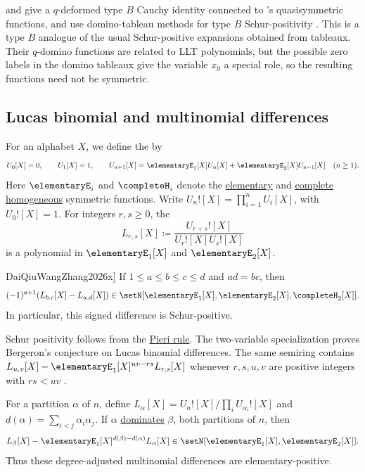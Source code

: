  and  give a
$q$-deformed type $B$ Cauchy identity connected to 's
quasisymmetric functions, and use domino-tableau methods for type $B$
Schur-positivity \cite{MayorovaVassilieva2022}.  This is a type $B$ analogue
of the usual Schur-positive expansions obtained from tableaux.
Their $q$-domino functions are related to LLT polynomials, but the possible
zero labels in the domino tableaux give the variable $x_0$ a special role, so
the resulting functions need not be symmetric.


\subsection[lucasSymmetricPositivity]{Lucas binomial and multinomial differences}

For an alphabet $X$, we define the  by
\[
 U_0[X]=0,\qquad U_1[X]=1,\qquad
 U_{n+1}[X]=\elementaryE_1[X]U_n[X]+\elementaryE_2[X]U_{n-1}[X]
 \quad(n\geq1).
\]
Here $\elementaryE_i$ and $\completeH_i$ denote the
\hyperref[elementaryE]{elementary} and
\hyperref[completeH]{complete homogeneous} symmetric functions.
Write $U_n![X]=\prod_{i=1}^n U_i[X]$, with $U_0![X]=1$.
For integers $r,s\geq0$, the 
\[
 L_{r,s}[X]\coloneqq\frac{U_{r+s}![X]}{U_r![X]U_s![X]}
\]
is a polynomial in $\elementaryE_1[X]$ and $\elementaryE_2[X]$.

\begin{theorem}[Dai--Qiu--Wang--Zhang, \cite[Thm.~1.2]{DaiQiuWangZhang2026x}]
If $1\leq a\leq b\leq c\leq d$ and $ad=bc$, then
\[
 (-1)^{a+1}(L_{b,c}[X]-L_{a,d}[X])
 \in\setN[\elementaryE_1[X],\elementaryE_2[X],\completeH_2[X]].
\]
In particular, this signed difference is Schur-positive.
\end{theorem}

Schur positivity follows from the \hyperref[schurPieriRule]{Pieri rule}.
The two-variable specialization proves Bergeron's conjecture on Lucas
binomial differences. The same semiring contains
$L_{u,v}[X]-\elementaryE_1[X]^{uv-rs}L_{r,s}[X]$ whenever
$r,s,u,v$ are positive integers with $rs<uv$
\cite[Thm.~1.4]{DaiQiuWangZhang2026x}.

For a partition $\alpha$ of $n$, define
$L_\alpha[X]=U_n![X]/\prod_i U_{\alpha_i}![X]$ and
$d(\alpha)=\sum_{i<j}\alpha_i\alpha_j$.
If $\alpha$ \hyperref[dominanceOrder]{dominates} $\beta$, both partitions of $n$, then
\cite[Thm.~1.5]{DaiQiuWangZhang2026x}
\[
 L_\beta[X]-\elementaryE_1[X]^{d(\beta)-d(\alpha)}L_\alpha[X]
 \in\setN[\elementaryE_1[X],\elementaryE_2[X]].
\]
Thus these degree-adjusted multinomial differences are elementary-positive.

